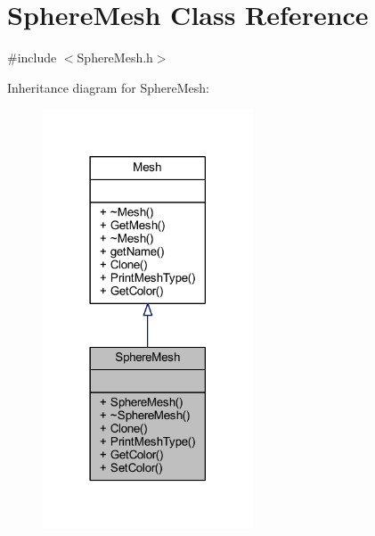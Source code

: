 \hypertarget{class_sphere_mesh}{}\section{Sphere\+Mesh Class Reference}
\label{class_sphere_mesh}


{\ttfamily \#include $<$Sphere\+Mesh.\+h$>$}



Inheritance diagram for Sphere\+Mesh\+:
\nopagebreak
\begin{figure}[H]
\begin{center}
\leavevmode
\includegraphics[width=177pt]{class_sphere_mesh__inherit__graph}
\end{center}
\end{figure}


